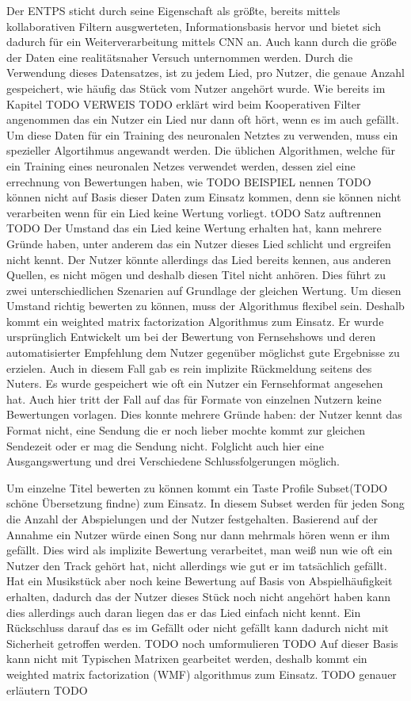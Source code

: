 \documentclass[twosided,a4,10pt]{article}
\begin{document}
\begin{multicols}{2}
		Der ENTPS sticht durch seine Eigenschaft als größte, bereits mittels kollaborativen Filtern ausgwerteten, Informationsbasis hervor und bietet sich dadurch für ein Weiterverarbeitung mittels CNN an. Auch kann durch die größe der Daten eine realitätsnaher Versuch unternommen werden. Durch die Verwendung dieses Datensatzes, ist zu jedem Lied, pro Nutzer, die genaue Anzahl gespeichert, wie häufig das Stück vom Nutzer angehört wurde. Wie bereits im Kapitel TODO VERWEIS TODO erklärt wird beim Kooperativen Filter angenommen das ein Nutzer ein Lied nur dann oft hört, wenn es im auch gefällt. Um diese Daten für ein Training des neuronalen Netztes zu verwenden, muss ein spezieller Algortihmus angewandt werden. Die üblichen Algorithmen, welche für ein Training eines neuronalen Netzes verwendet werden, dessen ziel eine errechnung von Bewertungen haben, wie TODO BEISPIEL nennen TODO können nicht auf Basis dieser Daten zum Einsatz kommen, denn sie können nicht verarbeiten wenn für ein Lied keine Wertung vorliegt. tODO Satz auftrennen TODO Der Umstand das ein Lied keine Wertung erhalten hat, kann mehrere Gründe haben, unter anderem das ein Nutzer dieses Lied schlicht und ergreifen nicht kennt. Der Nutzer könnte allerdings das Lied bereits kennen, aus anderen Quellen, es nicht mögen und deshalb diesen Titel nicht anhören. Dies führt zu zwei unterschiedlichen Szenarien auf Grundlage der gleichen Wertung. Um diesen Umstand richtig bewerten zu können, muss der Algorithmus flexibel sein. Deshalb kommt ein weighted matrix factorization Algorithmus zum Einsatz. Er wurde ursprünglich Entwickelt um bei der Bewertung von Fernsehshows und deren automatisierter Empfehlung dem Nutzer gegenüber möglichst gute Ergebnisse zu erzielen. Auch in diesem Fall gab es rein implizite Rückmeldung seitens des Nuters. Es wurde gespeichert wie oft ein Nutzer ein Fernsehformat angesehen hat. Auch hier tritt der Fall auf das für Formate von einzelnen Nutzern keine Bewertungen vorlagen. Dies konnte mehrere Gründe haben: der Nutzer kennt das Format nicht, eine Sendung die er noch lieber mochte kommt zur gleichen Sendezeit oder er mag die Sendung nicht. Folglicht auch hier eine Ausgangswertung und drei Verschiedene Schlussfolgerungen möglich.
		
		Um einzelne Titel bewerten zu können kommt ein Taste Profile Subset(TODO schöne Übersetzung findne) zum Einsatz. In diesem Subset werden für jeden Song die Anzahl der Abspielungen und der Nutzer festgehalten. Basierend auf der Annahme ein Nutzer würde einen Song nur dann mehrmals hören wenn er ihm gefällt. Dies wird als implizite Bewertung verarbeitet, man weiß nun wie oft ein Nutzer den Track gehört hat, nicht allerdings wie gut er im tatsächlich gefällt. Hat ein Musikstück aber noch keine Bewertung auf Basis von Abspielhäufigkeit erhalten, dadurch das der Nutzer dieses Stück noch nicht angehört haben kann dies allerdings auch daran liegen das er das Lied einfach nicht kennt. Ein Rückschluss darauf das es im Gefällt oder nicht gefällt kann dadurch nicht mit Sicherheit getroffen werden. TODO noch umformulieren TODO
		Auf dieser Basis kann nicht mit Typischen Matrixen gearbeitet werden, deshalb kommt ein weighted matrix factorization (WMF) algorithmus zum Einsatz. TODO genauer erläutern TODO
		

\end{multicols}
\end{document}
